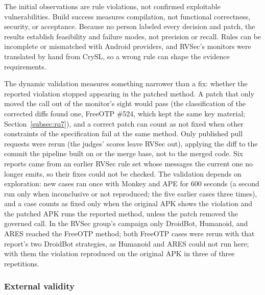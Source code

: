 \documentclass[conference]{IEEEtran}
\begin{document}
The initial observations are rule violations, not confirmed exploitable
vulnerabilities. Build success measures compilation, not functional
correctness, security, or acceptance. Because no person labeled every decision
and patch, the results establish feasibility and failure modes, not precision
or recall. Rules can be incomplete or mismatched with Android providers, and
RVSec's monitors were translated by hand from CrySL, so a wrong rule can shape
the evidence requirements.

The dynamic validation measures something narrower than a fix: whether the
reported violation stopped appearing in the patched method. A patch that only
moved the call out of the monitor's sight would pass (the classification of the
corrected diffs found one, FreeOTP \#524, which kept the same key material;
Section~\ref{subsec:rq7}), and a correct patch can
count as not fixed when other constraints of the specification fail at the
same method. Only published pull requests were rerun (the judges' scores
leave RVSec out), applying the diff to the commit the pipeline built on or the
merge base, not to the merged code. Six reports came from an earlier RVSec
rule set whose messages the current one no longer emits, so their fixes could
not be checked. The validation depends on exploration: new
cases ran once with Monkey and APE for 600 seconds (a second run only when
inconclusive or not reproduced; the five earlier cases three times), and a case
counts as fixed only when the original APK shows the violation and the patched
APK runs the reported method, unless the patch removed the governed call. In
the RVSec group's campaign only DroidBot, Humanoid, and ARES reached the
FreeOTP method; both FreeOTP cases were rerun with that report's two DroidBot
strategies, as Humanoid and ARES could not run here; with them the violation
reproduced on the original APK in three of three repetitions.

\subsubsection{External validity}
\end{document}

